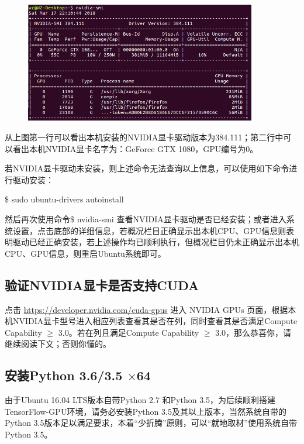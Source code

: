 \documentclass[11pt,a4paper]{ctexart}
\begin{document}
\begin{figure}[h]
\begin{center}
\includegraphics[width=0.9\textwidth]{NIVIDIA_Info} 
\end{center}
\end{figure}
\vspace{-0.5cm}
从上图第一行可以看出本机安装的NVIDIA显卡驱动版本为384.111；第二行中可以看出本机NVIDIA显卡名字为：GeForce GTX 1080，GPU编号为0。

若NVIDIA显卡驱动未安装，则上述命令无法查询以上信息，可以使用如下命令进行驱动安装：
\begin{center}
\$ sudo ubuntu-drivers autoinstall 
\end{center}
然后再次使用命令\$ nvidia-smi 查看NVIDIA显卡驱动是否已经安装；或者进入系统设置，点击底部的详细信息，若概况栏目正确显示出本机CPU、GPU信息则表明驱动已经正确安装，若上述操作均已顺利执行，但概况栏目仍未正确显示出本机CPU、GPU信息，则重启Ubuntu系统即可。


\subsection{验证NVIDIA显卡是否支持CUDA}
点击 \url{https://developer.nvidia.com/cuda-gpus} 进入 NVIDIA GPUs 页面，根据本机NVIDIA显卡型号进入相应列表查看其是否在列，同时查看其是否满足Compute Capability $\geq$ 3.0。若在列且满足Compute Capability $\geq$ 3.0，那么恭喜你，请继续阅读下文；否则你懂的。

\subsection{安装Python 3.6/3.5 $\times $64 }
由于Ubuntu 16.04 LTS版本自带Python 2.7 和Python 3.5，为后续顺利搭建TensorFlow-GPU环境，请务必安装Python 3.5及其以上版本，当然系统自带的Python 3.5版本足以满足要求，本着“少折腾”原则，可以“就地取材”使用系统自带Python 3.5。
\end{document}
